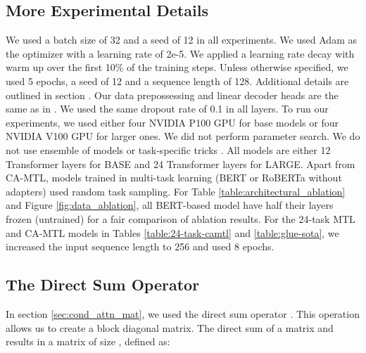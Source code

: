 \documentclass{article} \usepackage{iclr2021_conference,times}
\begin{document}
\subsection{More Experimental Details}
\label{append:more_xp_details}
We used a batch size of 32 and a seed of 12 in all experiments. We used Adam \citep{Kingma2015AdamAM} as the optimizer with a learning rate of 2e-5. We applied a learning rate decay with warm up over the first 10\% of the training steps. Unless otherwise specified, we used 5 epochs, a seed of 12 and a sequence length of 128. Additional details are outlined in section . Our data prepossessing and linear decoder heads are the same as in \citet{bert}. We used the same dropout rate of 0.1 in all layers. To run our experiments, we used either four NVIDIA P100 GPU for base models or four NVIDIA V100 GPU for larger ones. We did not perform parameter search. We do not use ensemble of models or task-specific tricks \citep{bert,mtl_bert_liu2019,mtl_bert_clark2019}. All models are either 12 Transformer layers for BASE and 24 Transformer layers for LARGE. Apart from CA-MTL, models trained in multi-task learning (BERT or RoBERTa without adapters) used random task sampling. For Table \ref{table:architectural_ablation} and Figure \ref{fig:data_ablation}, all BERT-based model have half their layers frozen (untrained) for a fair comparison of ablation results. For the 24-task MTL and CA-MTL models in Tables \ref{table:24-task-camtl} and \ref{table:glue-sota}, we increased the input sequence length to 256 and used 8 epochs. 

\subsection{The Direct Sum Operator}
\label{append:directsum}
In section \ref{sec:cond_attn_mat}, we used the direct sum operator . This operation allows us to create a block diagonal matrix. The direct sum of a matrix  and  results in a matrix of size  , defined as:\newline
\begin{center}

\end{center}
\end{document}
